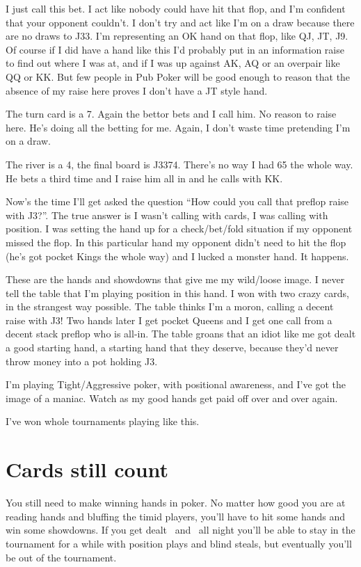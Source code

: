 I just call this bet. I act like nobody could have hit that flop, and
I'm confident that your opponent couldn't. I don't try and act like
I'm on a draw because there are no draws to J33. I'm representing an
OK hand on that flop, like QJ, JT, J9. Of course if I did have a hand
like this I'd probably put in an information raise to find out where
I was at, and if I was up against AK, AQ or an overpair like QQ or KK.
But few people in Pub Poker will be good enough to reason that the
absence of my raise here proves I don't have a JT style hand.

The turn card is a 7. Again the bettor bets and I call him.
No reason to raise here. He's doing all the betting for me. Again,
I don't waste time pretending I'm on a draw.

The river is a 4, the final board is J3374. There's no way I had 65
the whole way. He bets a third time and I raise him all in and he
calls with KK.

Now's the time I'll get asked the question ``How could you call that
preflop raise with J3?''. The true answer is I wasn't calling with
cards, I was calling with position. I was setting the hand up for
a check/bet/fold situation if my opponent missed the flop. In this
particular hand my opponent didn't need to hit the flop (he's got pocket
Kings the whole way) and I lucked a monster hand. It happens.

These are the hands and showdowns that give me my wild/loose image.
I never tell the table that I'm playing position in this hand.
I won with two crazy cards, in the strangest way possible. The table
thinks I'm a moron, calling a decent raise with J3! Two hands later I get
pocket Queens and I get one call from a decent stack preflop who is all-in.
The table groans that an idiot like me got dealt a good
starting hand, a starting hand that they deserve, because they'd never
throw money into a pot holding J3.

I'm playing Tight/Aggressive poker, with positional awareness,
and I've got the image of a maniac. Watch as my good hands get paid
off over and over again.

I've won whole tournaments playing like this.

\section{Cards still count}

You still need to make winning hands in poker. No matter how good you
are at reading hands and bluffing the timid players, you'll have to
hit some hands and win some showdowns. If you get dealt
\tenh\twoc\ and \Qh\fivec\ all night you'll be able to stay in
the tournament for a while with position plays and blind steals,
but eventually you'll be out of the tournament.

